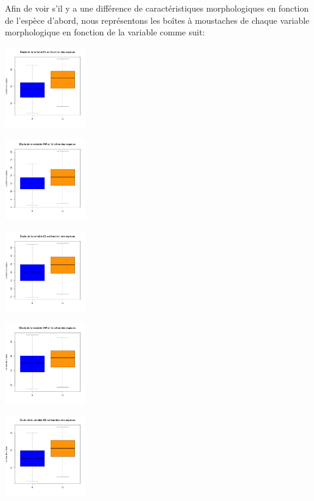\documentclass[10pt]{article}
\begin{document}
	Afin de voir s'il y a une différence de caractéristiques morphologiques en fonction de l'espèce d'abord, nous représentons les boîtes à moustaches de chaque variable morphologique en fonction de la variable  comme suit:
	
	\begin{center}
		\begin{minipage}[t]{0.3\textwidth}
			\includegraphics[width=35mm]{Figures/Crabs/bxp_sp_fl.png}
		\end{minipage}
		\begin{minipage}[t]{0.3\textwidth}
			\includegraphics[width=35mm]{Figures/Crabs/bxp_sp_rw.png}	
		\end{minipage}
		\begin{minipage}[t]{0.3\textwidth}
			\includegraphics[width=35mm]{Figures/Crabs/bxp_sp_cl.png}
		\end{minipage}
		\newline
		\begin{minipage}[t]{0.3\textwidth}
			\includegraphics[width=35mm]{Figures/Crabs/bxp_sp_cw.png}	
		\end{minipage}
		\begin{minipage}[t]{0.3\textwidth}
			\includegraphics[width=35mm]{Figures/Crabs/bxp_sp_bd.png}
		\end{minipage}
	\end{center}
	
\end{document}
